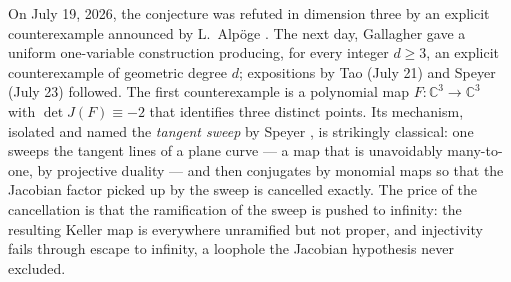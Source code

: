 \documentclass[11pt]{article}
\theoremstyle{plain}
\theoremstyle{definition}
\theoremstyle{remark}
\newcommand{\C}{\mathbb{C}}
\begin{document}
On July 19, 2026, the conjecture was refuted in dimension three by an explicit
counterexample announced by L.~Alp\"oge \cite{Alpoge2026}. The next day,
Gallagher \cite{Gallagher2026} gave a uniform one-variable construction
producing, for every integer $d\ge3$, an explicit counterexample of geometric
degree $d$; expositions by Tao (July 21) \cite{Tao2026} and Speyer
(July 23) \cite{Speyer2026} followed. The first
counterexample is a polynomial map $F\colon\C^3\to\C^3$ with
$\det J(F)\equiv-2$ that identifies three distinct points. Its mechanism, isolated
and named the \emph{tangent sweep} by Speyer \cite{Speyer2026}, is strikingly
classical: one sweeps the tangent lines of a plane curve --- a map that
is unavoidably many-to-one, by projective duality --- and then conjugates by
monomial maps so that the Jacobian factor picked up by the sweep is cancelled
exactly. The price of the cancellation is that the ramification of the sweep is
pushed to infinity: the resulting Keller map is everywhere unramified but not
proper, and injectivity fails through escape to infinity, a loophole the Jacobian
hypothesis never excluded.
\end{document}
